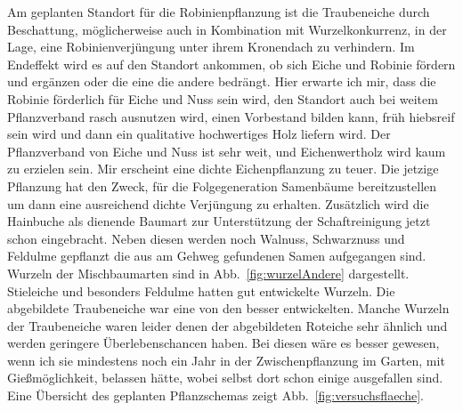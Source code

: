 \documentclass[twocolumn]{scrartcl}
\begin{document}
Am geplanten Standort für die Robinienpflanzung ist die Traubeneiche durch Beschattung,
möglicherweise auch in Kombination mit Wurzelkonkurrenz, in der Lage, eine Robinienverjüngung unter ihrem Kronendach zu verhindern.
Im Endeffekt wird es auf
den Standort ankommen, ob sich Eiche und Robinie fördern und ergänzen
oder die eine die andere bedrängt. Hier erwarte ich mir, dass die
Robinie förderlich für Eiche und Nuss sein wird, den Standort auch bei
weitem Pflanzverband rasch ausnutzen wird, einen Vorbestand bilden
kann, früh hiebsreif sein wird und dann ein qualitative hochwertiges
Holz liefern wird. Der Pflanzverband von Eiche und Nuss ist
sehr weit, und Eichenwertholz wird kaum zu erzielen sein. Mir
erscheint eine dichte Eichenpflanzung zu teuer. Die jetzige Pflanzung
hat den Zweck, für die Folgegeneration Samenbäume bereitzustellen um
dann eine ausreichend dichte Verjüngung zu erhalten. Zusätzlich wird
die Hainbuche als dienende Baumart zur Unterstützung der
Schaftreinigung jetzt schon eingebracht. Neben diesen werden noch
Walnuss, Schwarznuss und Feldulme gepflanzt die aus am Gehweg gefundenen
Samen aufgegangen sind. Wurzeln der Mischbaumarten sind in
Abb.~\ref{fig:wurzelAndere} dargestellt. Stieleiche und besonders Feldulme
hatten gut entwickelte Wurzeln. Die abgebildete Traubeneiche war eine
von den besser entwickelten. Manche Wurzeln der Traubeneiche waren leider denen der abgebildeten
Roteiche sehr ähnlich und werden geringere Überlebenschancen haben. Bei diesen wäre es besser gewesen, wenn ich sie mindestens
noch ein Jahr in der Zwischenpflanzung im Garten, mit Gießmöglichkeit,
belassen hätte, wobei selbst dort schon einige ausgefallen
sind. Eine Übersicht des geplanten Pflanzschemas zeigt
Abb.~\ref{fig:versuchsflaeche}.
\end{document}
